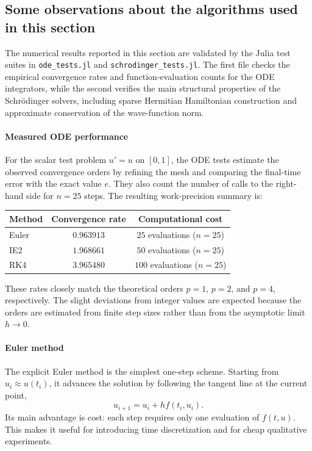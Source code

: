 \subsection{Some observations about the algorithms used in this section}

The numerical results reported in this section are validated by the Julia test
suites in \texttt{ode\_tests.jl} and
\texttt{schrodinger\_tests.jl}. The first file checks the
empirical convergence rates and function-evaluation counts for the ODE
integrators, while the second verifies the main structural properties of the
Schr\"odinger solvers, including sparse Hermitian Hamiltonian construction and
approximate conservation of the wave-function norm.

\paragraph{Measured ODE performance}
For the scalar test problem $u'=u$ on $[0,1]$, the ODE tests estimate the
observed convergence orders by refining the mesh and comparing the final-time
error with the exact value $e$. They also count the number of calls to the
right-hand side for $n=25$ steps. The resulting work-precision summary is:

\begin{center}
	\renewcommand{\arraystretch}{1.2}
	\begin{tabular}{lcc}
		\toprule
		Method & Convergence rate & Computational cost \\
		\midrule
		Euler & $0.963913$ & $25$ evaluations ($n=25$) \\
		IE2   & $1.968661$ & $50$ evaluations ($n=25$) \\
		RK4   & $3.965480$ & $100$ evaluations ($n=25$) \\
		\bottomrule
	\end{tabular}
\end{center}

These rates closely match the theoretical orders $p=1$, $p=2$, and $p=4$,
respectively. The slight deviations from integer values are expected because the
orders are estimated from finite step sizes rather than from the asymptotic limit
$h\to0$.

\paragraph{Euler method}
The explicit Euler method is the simplest one-step scheme. Starting from
$u_i\approx u(t_i)$, it advances the solution by following the tangent line at
the current point,
\[
	u_{i+1}=u_i+h f(t_i,u_i).
\]
Its main advantage is cost: each step requires only one evaluation of
$f(t,u)$. This makes it useful for introducing time discretization and for cheap
qualitative experiments.

